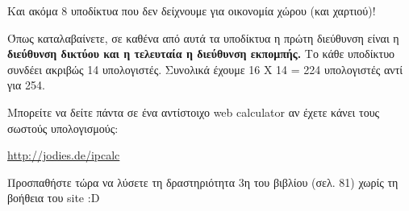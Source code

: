 Και ακόμα 8 υποδίκτυα που δεν δείχνουμε για οικονομία χώρου (και χαρτιού)!

Όπως καταλαβαίνετε, σε καθένα από αυτά τα υποδίκτυα η πρώτη διεύθυνση είναι η \textbf{διεύθυνση δικτύου και η τελευταία η διεύθυνση εκπομπής.} Το κάθε υποδίκτυο συνδέει ακριβώς 14 υπολογιστές. Συνολικά έχουμε 16 Χ 14 = 224 υπολογιστές αντί για 254.

Μπορείτε να δείτε πάντα σε ένα αντίστοιχο web calculator αν έχετε κάνει τους σωστούς υπολογισμούς:

\begin{center}
\url{http://jodies.de/ipcalc} 
\end{center}

Προσπαθήστε τώρα να λύσετε τη δραστηριότητα 3η του βιβλίου (σελ. 81) χωρίς τη βοήθεια του site :D 